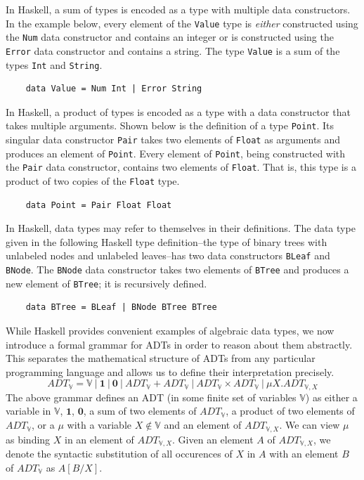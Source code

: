 \documentclass{msthesis}
\theoremstyle{definition}
\newcommand{\vars}{\mathbb{V}}
\begin{document}
In Haskell, a sum of types is encoded as a type with multiple data constructors.  In the example below, every element of the \verb"Value" type is \emph{either} constructed using the \verb"Num" data constructor and contains an integer or is constructed using the \verb"Error" data constructor and contains a string.  The type \verb"Value" is a sum of the types \verb"Int" and \verb"String".
\begin{verbatim}
    data Value = Num Int | Error String
\end{verbatim}

In Haskell, a product of types is encoded as a type with a data constructor that takes multiple arguments.  Shown below is the definition of a type \verb"Point".  Its singular data constructor \verb"Pair" takes two elements of \verb"Float" as arguments and produces an element of \verb"Point".  Every element of \verb"Point", being constructed with the \verb"Pair" data constructor, contains two elements of \verb"Float".  That is, this type is a product of two copies of the \verb"Float" type.
\begin{verbatim}
    data Point = Pair Float Float
\end{verbatim}


In Haskell, data types may refer to themselves in their definitions.  The data type given in the following Haskell type definition--the type of binary trees with unlabeled nodes and unlabeled leaves--has two data constructors \verb"BLeaf" and \verb"BNode".  The \verb"BNode" data constructor takes two elements of \verb"BTree" and produces a new element of \verb"BTree"; it is recursively defined.
\begin{verbatim}
    data BTree = BLeaf | BNode BTree BTree
\end{verbatim}

While Haskell provides convenient examples of algebraic data types, we now introduce a formal grammar for ADTs in order to reason about them abstractly. This separates the mathematical structure of ADTs from any particular programming language and allows us to define their interpretation precisely.
\newcommand{\mb}{\mathbf}
\[ ADT_{\vars} = \vars\ |\ \mathbf{1}\ |\ \mathbf{0}\ |\ ADT_\vars + ADT_\vars\ |\ ADT_\vars \times ADT_\vars\ |\ \mu X.ADT_{\vars, X} \]
The above grammar defines an ADT (in some finite set of variables $\vars$) as either a variable in $\vars$, $\mathbf{1}$, $\mathbf{0}$, a sum of two elements of $ADT_\vars$, a product of two elements of $ADT_\vars$, or a $\mu$ with a variable $X \notin \vars$ and an element of $ADT_{\vars,X}$.  We can view $\mu$ as binding $X$ in an element of $ADT_{\vars,X}$.  Given an element $A$ of $ADT_{\vars,X}$, we denote the syntactic substitution of all occurences of $X$ in $A$ with an element $B$ of $ADT_\vars$ as $A[B/X]$.
\end{document}
